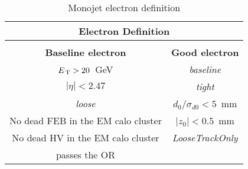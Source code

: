 \begin{table}[!th]
  \centering
  \begin{tabular}{cc}
    \multicolumn{2}{c}{Electron Definition} \\
    \hline \hline \\
    \textbf{Baseline electron} & \textbf{Good electron} \\
    \hline
    $E_\mathrm{\, T} > 20$~GeV & \emph{baseline} \\
    $|\eta| < 2.47$ & \emph{tight} \\
    \emph{loose} & $d_0 / \sigma_{d0} < 5$~mm \\
    No dead FEB in the EM calo cluster & $|z_0| < 0.5$~mm \\
    No dead HV in the EM calo cluster & \emph{LooseTrackOnly} \\
    passes the OR & \\
    \hline \hline
  \end{tabular}
  \caption{Monojet electron definition}
  \label{tab:ele_def}
\end{table}
